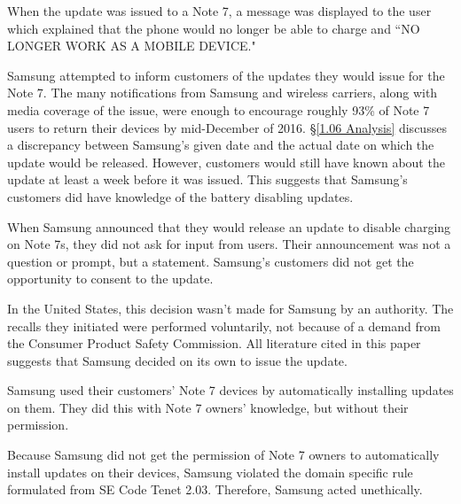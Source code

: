 \documentclass[12pt]{article}
\newcounter{subsubsubsection}[subsubsection]
\begin{document}
When the update was issued to a Note 7, a message was displayed to the user which explained that the phone would no longer be able to charge and ``NO LONGER WORK AS A MOBILE DEVICE."\cite{youtubeKillUpdateScreenshots}

Samsung attempted to inform customers of the updates they would issue for the Note 7. The many notifications from Samsung and wireless carriers, along with media coverage of the issue, were enough to encourage roughly 93\% of Note 7 users to return their devices by mid-December of 2016\cite{bgrCarriersRecallMessages}. \S\ref{1.06 Analysis} discusses a discrepancy between Samsung's given date and the actual date on which the update would be released. However, customers would still have known about the update at least a week before it was issued\cite{pocketnowNoLongerWorkMessageUSCellular}. This suggests that Samsung's customers did have knowledge of the battery disabling updates.

\label{sec:Analysis.2.03.Analysis.Customers' Permission}
When Samsung announced that they would release an update to disable charging on Note 7s, they did not ask for input from users. Their announcement was not a question or prompt, but a statement\cite{samsungFullRecallAnnounce}. Samsung's customers did not get the opportunity to consent to the update.

In the United States, this decision wasn't made for Samsung by an authority. The recalls they initiated were performed voluntarily, not because of a demand from the Consumer Product Safety Commission\cite{CPSC}. All literature cited in this paper suggests that Samsung decided on its own to issue the update.


Samsung used their customers' Note 7 devices by automatically installing updates on them. They did this with Note 7 owners' knowledge, but without their permission.

Because Samsung did not get the permission of Note 7 owners to automatically install updates on their devices, Samsung violated the domain specific rule formulated from SE Code Tenet 2.03. Therefore, Samsung acted unethically.

\end{document}
